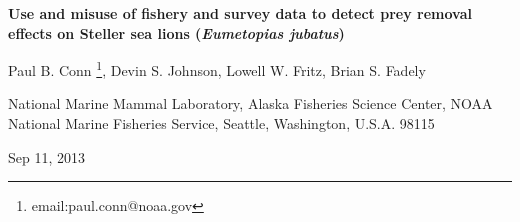 \documentclass[11pt]{article}
\begin{document}



\begin{center}
{\bf Use and misuse of fishery and survey data to detect prey removal effects on Steller sea lions ({\it Eumetopias jubatus})}

\bigskip

\vspace{3in}

Paul B. Conn \footnote[1]{email:paul.conn@noaa.gov}, Devin S. Johnson, Lowell W. Fritz, Brian S. Fadely

\vspace{0.5in}

National Marine Mammal Laboratory, Alaska Fisheries Science Center,
NOAA National Marine Fisheries Service,
Seattle, Washington, U.S.A. 98115 \\

\vspace{1in}


Sep 11, 2013
\end{center}


\clearpage



\end{document}
